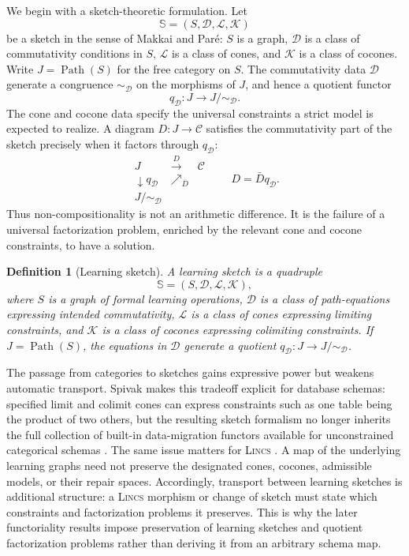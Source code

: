 \documentclass{article}
\newtheorem{definition}{Definition}
\newcommand{\C}{\mathcal{C}}
\newcommand{\Path}{\operatorname{Path}}
\begin{document}
We begin with a sketch-theoretic formulation. Let
\[
\mathbb S=(S,\mathcal D,\mathcal L,\mathcal K)
\]
be a sketch in the sense of Makkai and Par{\'e}: \(S\) is a graph, \(\mathcal D\) is a class of commutativity conditions in \(S\), \(\mathcal L\) is a class of cones, and \(\mathcal K\) is a class of cocones. Write \(J=\Path(S)\) for the free category on \(S\). The commutativity data \(\mathcal D\) generate a congruence \(\sim_{\mathcal D}\) on the morphisms of \(J\), and hence a quotient functor
\[
q_{\mathcal D}:J\to J/{\sim_{\mathcal D}}.
\]
The cone and cocone data specify the universal constraints a strict model is expected to realize. A diagram \(D:J\to\C\) satisfies the commutativity part of the sketch precisely when it factors through \(q_{\mathcal D}\):
\[
\begin{array}{ccc}
J & \xrightarrow{D} & \C\\
\downarrow q_{\mathcal D} & \nearrow_{\bar D}\\
J/{\sim_{\mathcal D}}
\end{array}
\qquad
D=\bar D q_{\mathcal D}.
\]
Thus non-compositionality is not an arithmetic difference. It is the failure of a universal factorization problem, enriched by the relevant cone and cocone constraints, to have a solution.

\begin{definition}[Learning sketch]
A learning sketch is a quadruple
\[
\mathbb S=(S,\mathcal D,\mathcal L,\mathcal K),
\]
where \(S\) is a graph of formal learning operations, \(\mathcal D\) is a class of path-equations expressing intended commutativity, \(\mathcal L\) is a class of cones expressing limiting constraints, and \(\mathcal K\) is a class of cocones expressing colimiting constraints. If \(J=\Path(S)\), the equations in \(\mathcal D\) generate a quotient \(q_{\mathcal D}:J\to J/{\sim_{\mathcal D}}\).
\end{definition}

The passage from categories to sketches gains expressive power but weakens
automatic transport.  Spivak makes this tradeoff explicit for database
schemas: specified limit and colimit cones can express constraints such as one
table being the product of two others, but the resulting sketch formalism no
longer inherits the full collection of built-in data-migration functors
available for unconstrained categorical schemas \citep{spivak2014lifting}.
The same issue matters for \textsc{Lincs}  .  A map of the underlying learning graphs need
not preserve the designated cones, cocones, admissible models, or their repair
spaces.  Accordingly, transport between learning sketches is additional
structure: a \textsc{Lincs}   morphism or change of sketch must state which constraints
and factorization problems it preserves.  This is why the later functoriality
results impose preservation of learning sketches and quotient factorization
problems rather than deriving it from an arbitrary schema map.
\end{document}
